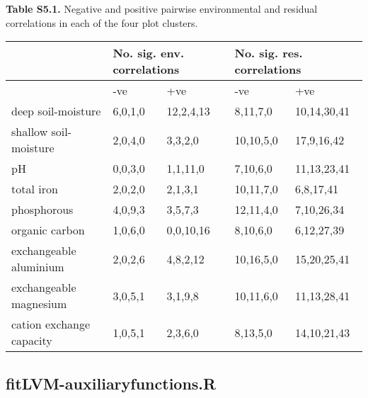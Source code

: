 \begin{table}[H]
  \centering
  \flushleft\textbf{Table S5.1.} Negative and positive pairwise environmental and residual correlations in each of the four plot clusters. 
    \begin{tabular}{lllll}
    \toprule
          & \multicolumn{2}{l}{No. sig. env. correlations} & \multicolumn{2}{l}{No. sig. res. correlations} \\
    \midrule
          & -ve   & +ve   & -ve   & +ve \\
    deep soil-moisture & 6,0,1,0 & 12,2,4,13 & 8,11,7,0 & 10,14,30,41 \\
    shallow soil-moisture & 2,0,4,0 & 3,3,2,0 & 10,10,5,0 & 17,9,16,42 \\
    pH    & 0,0,3,0 & 1,1,11,0 & 7,10,6,0 & 11,13,23,41 \\
    total iron & 2,0,2,0 & 2,1,3,1 & 10,11,7,0 & 6,8,17,41 \\
    phosphorous & 4,0,9,3 & 3,5,7,3 & 12,11,4,0 & 7,10,26,34 \\
    organic carbon & 1,0,6,0 & 0,0,10,16 & 8,10,6,0 & 6,12,27,39 \\
    exchangeable aluminium & 2,0,2,6 & 4,8,2,12 & 10,16,5,0 & 15,20,25,41 \\
    exchangeable magnesium & 3,0,5,1 & 3,1,9,8 & 10,11,6,0 & 11,13,28,41 \\
    cation exchange capacity & 1,0,5,1 & 2,3,6,0 & 8,13,5,0 & 14,10,21,43 \\
    \bottomrule
    \end{tabular}%
  \label{tab:addlabel}%
\end{table}%



\subsection{fitLVM-auxiliaryfunctions.R}


